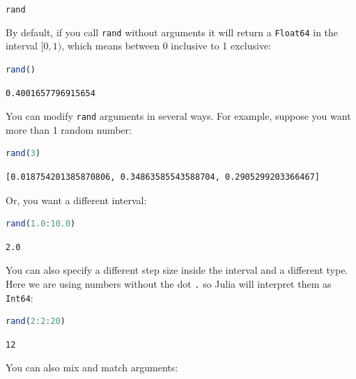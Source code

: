 \documentclass[
  notoc %
]{tufte-book}
\makeatletter
\newcommand{\passthrough}[1]{#1}
\renewcommand\subsubsection{%
\@startsection{subsubsection}{3}{\z@ }{-3.25ex\@plus -1ex \@minus -.2ex}{1.5ex \@plus .2ex}{\normalfont \normalsize \bfseries }
}
\makeatother
\begin{document}
\hypertarget{sec:random_rand}{%
\subsubsection{\texorpdfstring{\texttt{rand}}{rand}}\label{sec:random_rand}}

By default, if you call \passthrough{\lstinline!rand!} without arguments
it will return a \passthrough{\lstinline!Float64!} in the interval
\([0, 1)\), which means between 0 inclusive to 1 exclusive:

\begin{lstlisting}[language=Julia]
rand()
\end{lstlisting}

\begin{lstlisting}[language=Output]
0.4001657796915654
\end{lstlisting}

You can modify \passthrough{\lstinline!rand!} arguments in several ways.
For example, suppose you want more than 1 random number:

\begin{lstlisting}[language=Julia]
rand(3)
\end{lstlisting}

\begin{lstlisting}[language=Output]
[0.018754201385870806, 0.34863585543588704, 0.2905299203366467]
\end{lstlisting}

Or, you want a different interval:

\begin{lstlisting}[language=Julia]
rand(1.0:10.0)
\end{lstlisting}

\begin{lstlisting}[language=Output]
2.0
\end{lstlisting}

You can also specify a different step size inside the interval and a
different type. Here we are using numbers without the dot
\passthrough{\lstinline!.!} so Julia will interpret them as
\passthrough{\lstinline!Int64!}:

\begin{lstlisting}[language=Julia]
rand(2:2:20)
\end{lstlisting}

\begin{lstlisting}[language=Output]
12
\end{lstlisting}

You can also mix and match arguments:
\end{document}
